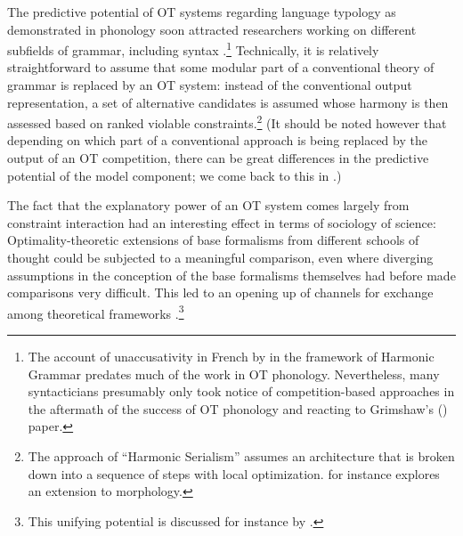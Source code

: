 \documentclass[output=paper,hidelinks]{langscibook}
\begin{document}
The predictive potential of OT systems regarding language typology as demonstrated in phonology soon attracted researchers working on different subfields of grammar, including syntax \citep{Grimshaw97,SamekLodovici96,Pesetsky98,Legendre-etal-1998}.\footnote{The account of unaccusativity in French by \citet{Legendre-etal-1990} in the framework of Harmonic Grammar predates much of the work in OT phonology. Nevertheless, many syntacticians presumably only took notice of competition-based approaches in the aftermath of the success of OT phonology and reacting to Grimshaw's (\citeyear{Grimshaw97}) paper.} %
Technically, it is relatively straightforward to assume that some modular part of a conventional theory of grammar is replaced by an OT system: instead of the conventional output representation, a set of alternative candidates is assumed whose harmony is then assessed based on ranked violable constraints.\footnote{The approach of ``Harmonic Serialism'' assumes an architecture that is broken down into a sequence of steps with local optimization. \citet{Mueller2020} for instance explores an extension to morphology.} 
(It should be noted however that depending on which part of a conventional approach is being replaced by the output of an OT competition, there can be great differences in the predictive potential of the model component; we come back to this in .)

\begin{sloppypar}
The fact that the explanatory power of an OT system comes largely from constraint interaction had an interesting effect in terms of sociology of science:  Optimality-theoretic extensions of base formalisms from different schools of thought could be subjected to a meaningful comparison, even where diverging assumptions in the conception of the base formalisms themselves had before made comparisons very difficult. This led to an opening up of channels for exchange among theoretical frameworks \citep[see for instance the collection of contributions  in][]{legetal00}.\footnote{This unifying potential is discussed for instance by \citet[44]{Newmeyer2002}.}     
\end{sloppypar}
\end{document}
